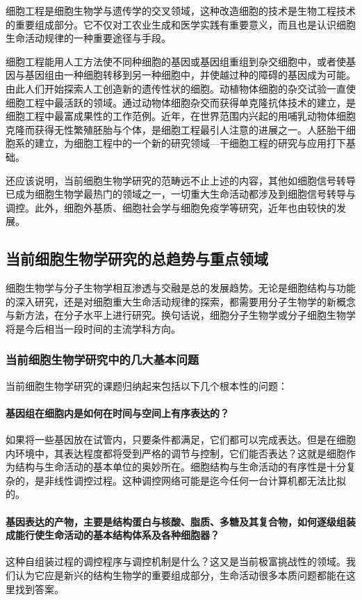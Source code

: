 细胞工程是细胞生物学与遗传学的交叉领域，这种改造细胞的技术是生物工程技术的重要组成部分。它不仅对工农业生成和医学实践有重要意义，而且也是认识细胞生命活动规律的一种重要途径与手段。

细胞工程能用人工方法使不同种细胞的基因或基因组重组到杂交细胞中，或者使基因与基因组由一种细胞转移到另一种细胞中，并使越过种的障碍的基因成为可能。由此人们开始探索人工创造新的遗传性状的细胞。动植物体细胞的杂交试验一直使细胞工程中最活跃的领域。通过动物体细胞杂交而获得单克隆抗体技术的建立，是细胞工程中最富成果性的工作范例。近年，在世界范围内兴起的用哺乳动物体细胞克隆而获得无性繁殖胚胎与个体，是细胞工程最引人注意的进展之一。人胚胎干细胞系的建立，为细胞工程中的一个新的研究领域---干细胞工程的研究与应用打下基础。

还应该说明，当前细胞生物学研究的范畴远不止上述的内容，其他如细胞信号转导已成为细胞生物学最热门的领域之一，一切重大生命活动都涉及到细胞信号转导与调控。此外，细胞外基质、细胞社会学与细胞免疫学等研究，近年也由较快的发展。

\subsection{当前细胞生物学研究的总趋势与重点领域}

细胞生物学与分子生物学相互渗透与交融是总的发展趋势。无论是细胞结构与功能的深入研究，还是对细胞重大生命活动规律的探索，都需要用分子生物学的新概念与新方法，在分子水平上进行研究。换句话说，细胞分子生物学或分子细胞生物学将是今后相当一段时间的主流学科方向。

\subsubsection{当前细胞生物学研究中的几大基本问题}

当前细胞生物学研究的课题归纳起来包括以下几个根本性的问题：

\paragraph{基因组在细胞内是如何在时间与空间上有序表达的？}
如果将一些基因放在试管内，只要条件都满足，它们都可以完成表达。但是在细胞内环境中，其表达程度都将受到严格的调节与控制，它们能否表达？这就是细胞作为结构与生命活动的基本单位的奥妙所在。细胞结构与生命活动的有序性是十分复杂的，是非线性调控过程。这种调控网络可能是迄今任何一台计算机都无法比拟的。

\paragraph{基因表达的产物，主要是结构蛋白与核酸、脂质、多糖及其复合物，如何逐级组装成能行使生命活动的基本结构体系及各种细胞器？}
这种自组装过程的调控程序与调控机制是什么？这又是当前极富挑战性的领域。我们认为它应是新兴的结构生物学的重要组成部分，生命活动很多本质问题都能在这里找到答案。

